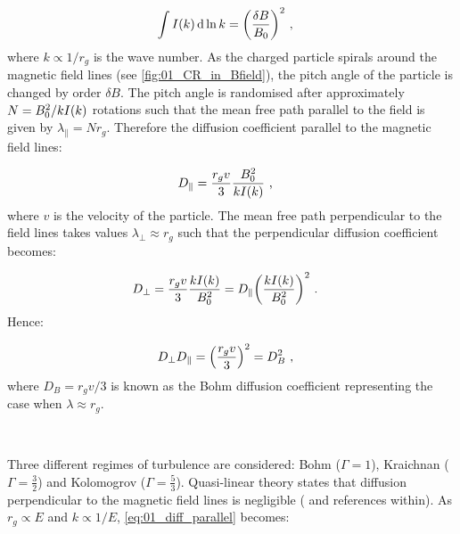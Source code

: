 \begin{equation}
    \begin{aligned}
        \int I\qty(k) \dd{\ln k}&= \qty(\frac{\delta B}{B_0})^2\text{ ,}
    \end{aligned}
\end{equation}
\noindent where $k\propto 1/r_g$ is the wave number. As the charged particle spirals around the magnetic field lines (see \autoref{fig:01_CR_in_Bfield}), the pitch angle of the particle is changed by order $\delta B$. The pitch angle is randomised after approximately $N=B_0^2/kI\qty(k)$ rotations such that the mean free path parallel to the field is given by $\lambda_\parallel=Nr_g$. Therefore the diffusion coefficient parallel to the magnetic field lines:

\begin{equation}
    \begin{aligned}
        D_\parallel&=\frac{r_gv}{3}\frac{B_0^2}{kI\qty(k)}\text{ ,}
    \end{aligned} \label{eq:01_diff_parallel}
\end{equation}
\noindent where $v$ is the velocity of the particle. The mean free path perpendicular to the field lines takes values $\lambda_\perp\approx r_g$ such that the perpendicular diffusion coefficient becomes:

\begin{equation}
    \begin{aligned}
        D_\perp&=\frac{r_gv}{3}\frac{kI\qty(k)}{B_0^2}=D_\parallel\qty(\frac{kI\qty(k)}{B_0^2})^2\text{ .}
    \end{aligned}
\end{equation}
\noindent Hence:

\begin{equation}
    \begin{aligned}
        D_\perp D_\parallel&=\qty(\frac{r_gv}{3})^2=D_B^2\text{ ,}
    \end{aligned}
\end{equation}
\noindent where $D_B=r_gv/3$ is known as the Bohm diffusion coefficient representing the case when $\lambda\approx r_g$.
\par~\par 
Three different regimes of turbulence are considered: Bohm ($\Gamma=1$), Kraichnan ($\Gamma=\frac{3}{2}$) and Kolomogrov ($\Gamma=\frac{5}{3}$). Quasi-linear theory states that diffusion perpendicular to the magnetic field lines is negligible (\cite{2016MNRAS.461.3552N} and references within). As $r_g\propto E$ and $k\propto 1/E$, \autoref{eq:01_diff_parallel} becomes:


